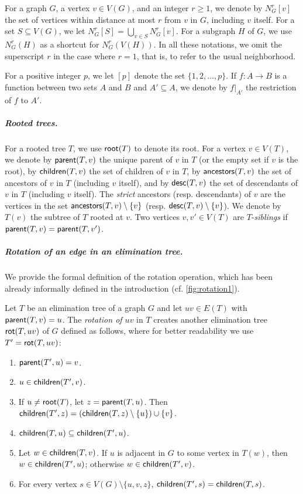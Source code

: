 \documentclass[a4paper,UKenglish,cleveref, autoref, thm-restate]{lipics-v2021}
\newcommand{\parent}{{\sf parent}\xspace}
\newcommand{\child}{{\sf children}\xspace}
\renewcommand{\root}{{\sf root}\xspace}
\newcommand{\anc}{{\sf ancestors}\xspace}
\newcommand{\descendants}{{\sf desc}\xspace}
\newcommand{\rot}{{\sf rot}\xspace}
\begin{document}
For a graph $G$, a vertex $v \in V(G)$, and an integer $r \geq 1$, we denote by $N_G^{r}[v]$ the set of vertices within distance at most $r$ from $v$ in $G$, including $v$ itself. For a set $S \subseteq V(G)$, we let $N_G^{r}[S] = \bigcup_{v \in S}N_G^{r}[v]$. For a subgraph $H$ of $G$, we use $N_G^{r}(H)$ as a shortcut for $N_G^{r}(V(H))$. In all these notations, we omit the superscript $r$ in the case where $r=1$, that is, to refer to the usual neighborhood.


For a positive integer $p$, we let $[p]$ denote the set $\{1, 2, \ldots, p\}$. If $f:A \to B$ is a function between two sets $A$ and $B$ and $A' \subseteq A$, we denote by $f|_{A'}$ the restriction of $f$ to $A'$.

\subparagraph*{Rooted trees.} For a rooted tree $T$, we use $\root(T)$ to denote its root. For a vertex $v \in V(T)$, we denote by $\parent(T,v)$ the unique parent of $v$ in $T$ (or the empty set if $v$ is the root),  by $\child(T,v)$ the set of children of $v$ in $T$, by $\anc(T,v)$ the set of ancestors of $v$ in $T$ (including $v$ itself), and by $\descendants(T,v)$ the set of descendants of $v$ in $T$ (including $v$ itself). The \emph{strict} ancestors (resp. descendants) of $v$ are the vertices in the set $\anc(T,v) \setminus \{v\}$ (resp. $\descendants(T,v) \setminus \{v\}$). We denote by $T(v)$ the subtree of $T$ rooted at $v$. Two vertices $v,v' \in V(T)$ are $T$-\emph{siblings} if $\parent(T,v) = \parent(T,v')$.


\subparagraph*{Rotation of an edge in an elimination tree.} We provide the formal definition of the rotation operation, which has been already informally defined in the introduction (cf. \autoref{fig:rotation1}).

\begin{definition}\label{def:rotation}
Let $T$ be an elimination tree of a graph $G$ and let $uv \in E(T)$ with $\parent(T,v) = u$. The {\em rotation of $uv$} in $T$ creates another elimination tree $\rot(T,uv)$ of $G$ defined as follows, where for better readability we use $T' = \rot(T,uv)$:
\begin{enumerate}
    \item $\parent(T',u)=v$.
    \item $u \in \child(T',v)$.
    \item If $u \neq \root(T)$, let $z = \parent(T,u)$. Then $\child(T',z) =(\child(T,z) \setminus\{u\}) \cup \{v\}$.
    \item $\child(T,u) \subseteq \child(T',u)$.
    \item Let $w \in \child(T,v)$. If $u$ is adjacent in $G$ to some vertex in $T(w)$, then $w \in \child(T',u)$; otherwise $w \in \child(T',v)$.
    \item\label{item6} For every vertex $s \in V(G) \setminus \{u,v,z\}$, $\child(T',s)=\child(T,s)$.
\end{enumerate}
\end{definition}
\end{document}
